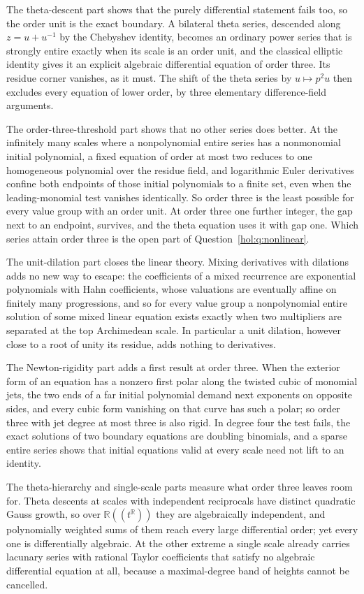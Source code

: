 \documentclass[11pt]{article}
\numberwithin{equation}{section}
\theoremstyle{definition}
\theoremstyle{remark}
\newcommand{\R}{\mathbb R}
\begin{document}
The theta-descent part shows that the purely differential statement fails
too, so the order unit is the exact boundary. A bilateral theta series,
descended along $z=u+u^{-1}$ by the Chebyshev identity, becomes an ordinary
power series that is strongly entire exactly when its scale is an order unit,
and the classical elliptic identity gives it an explicit algebraic
differential equation of order three. Its residue corner vanishes, as it
must. The shift of the theta series by $u\mapsto p^2u$ then excludes every
equation of lower order, by three elementary difference-field arguments.

The order-three-threshold part shows that no other series does better. At the
infinitely many scales where a nonpolynomial entire series has a nonmonomial
initial polynomial, a fixed equation of order at most two reduces to one
homogeneous polynomial over the residue field, and logarithmic Euler
derivatives confine both endpoints of those initial polynomials to a finite
set, even when the leading-monomial test vanishes identically. So order three
is the least possible for every value group with an order unit. At order three
one further integer, the gap next to an endpoint, survives, and the theta
equation uses it with gap one. Which series attain order three is the open
part of Question~\ref{hol:q:nonlinear}.

The unit-dilation part closes the linear theory. Mixing derivatives with
dilations adds no new way to escape: the coefficients of a mixed recurrence
are exponential polynomials with Hahn coefficients, whose valuations are
eventually affine on finitely many progressions, and so for every value
group a nonpolynomial entire solution of some mixed linear equation exists
exactly when two multipliers are separated at the top Archimedean scale. In
particular a unit dilation, however close to a root of unity its residue,
adds nothing to derivatives.

The Newton-rigidity part adds a first result at order three. When the
exterior form of an equation has a nonzero first polar along the twisted
cubic of monomial jets, the two ends of a far initial polynomial demand next
exponents on opposite sides, and every cubic form vanishing on that curve has
such a polar; so order three with jet degree at most three is also rigid. In
degree four the test fails, the exact solutions of two boundary equations are
doubling binomials, and a sparse entire series shows that initial equations
valid at every scale need not lift to an identity.

The theta-hierarchy and single-scale parts measure what order three leaves
room for. Theta descents at scales with independent reciprocals have distinct
quadratic Gauss growth, so over $\R((t^\R))$ they are algebraically
independent, and polynomially weighted sums of them reach every large
differential order; yet every one is differentially algebraic. At the other
extreme a single scale already carries lacunary series with rational Taylor
coefficients that satisfy no algebraic differential equation at all, because a
maximal-degree band of heights cannot be cancelled.
\end{document}
